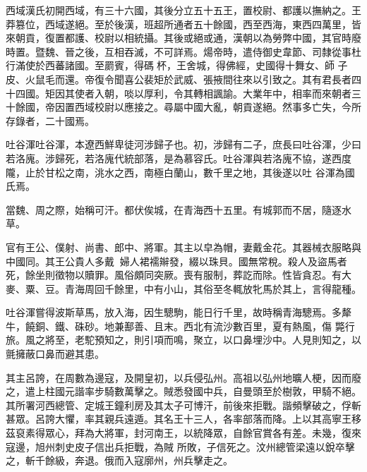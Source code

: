 
\begin{pinyinscope}

 西域漢氏初開西域，有三十六國，其後分立五十五王，置校尉、都護以撫納之。王莽篡位，西域遂絕。至於後漢，班超所通者五十餘國，西至西海，東西四萬里，皆來朝貢，復置都護、校尉以相統攝。其後或絕或通，漢朝以為勞弊中國，其官時廢時置。暨魏、晉之後，互相吞滅，不可詳焉。煬帝時，遣侍御史韋節、司隸從事杜行滿使於西蕃諸國。至罽賓，得碼杯，王舍城，得佛經，史國得十舞女、師
 子皮、火鼠毛而還。帝復令聞喜公裴矩於武威、張掖間往來以引致之。其有君長者四十四國。矩因其使者入朝，啖以厚利，令其轉相諷諭。大業年中，相率而來朝者三十餘國，帝因置西域校尉以應接之。尋屬中國大亂，朝貢遂絕。然事多亡失，今所存錄者，二十國焉。



 吐谷渾吐谷渾，本遼西鮮卑徒河涉歸子也。初，涉歸有二子，庶長曰吐谷渾，少曰若洛廆。涉歸死，若洛廆代統部落，是為慕容氏。吐谷渾與若洛廆不協，遂西度隴，止於甘松之南，洮水之西，南極白蘭山，數千里之地，其後遂以吐
 谷渾為國氏焉。



 當魏、周之際，始稱可汗。都伏俟城，在青海西十五里。有城郭而不居，隨逐水草。



 官有王公、僕射、尚書、郎中、將軍。其主以皁為帽，妻戴金花。其器械衣服略與中國同。其王公貴人多戴，婦人裙襦辮發，綴以珠貝。國無常稅。殺人及盜馬者死，餘坐則徵物以贖罪。風俗頗同突厥。喪有服制，葬訖而除。性皆貪忍。有大麥、粟、豆。青海周回千餘里，中有小山，其俗至冬輒放牝馬於其上，言得龍種。



 吐谷渾嘗得波斯草馬，放入海，因生驄駒，能日行千里，故時稱青海驄焉。多犛牛，饒銅、鐵、硃砂。地兼鄯善、且末。西北有流沙數百里，夏有熱風，傷
 斃行旅。風之將至，老駝預知之，則引項而鳴，聚立，以口鼻埋沙中。人見則知之，以氈擁蔽口鼻而避其患。



 其主呂誇，在周數為邊寇，及開皇初，以兵侵弘州。高祖以弘州地曠人梗，因而廢之，遣上柱國元諧率步騎數萬擊之。賊悉發國中兵，自曼頭至於樹敦，甲騎不絕。其所署河西總管、定城王鐘利房及其太子可博汗，前後來拒戰。諧頻擊破之，俘斬甚眾。呂誇大懼，率其親兵遠遁。其名王十三人，各率部落而降。上以其高寧王移茲裒素得眾心，拜為大將軍，封河南王，以統降眾，自餘官賞各有差。未幾，復來寇邊，旭州刺史皮子信出兵拒戰，為賊
 所敗，子信死之。汶州總管梁遠以銳卒擊之，斬千餘級，奔退。俄而入寇廓州，州兵擊走之。




\end{pinyinscope}
